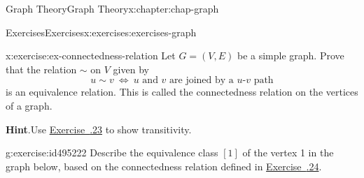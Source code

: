 \documentclass[oneside,10pt,]{book}
\newcommand{\blocktitlefont}{\relax}
\newcommand{\xreffont}{\relax}
\numberwithin{equation}{section}
\begin{document}
\begin{chapterptx}{Graph Theory}{}{Graph Theory}{}{}{x:chapter:chap-graph}
\begin{exercises-section}{Exercises}{}{Exercises}{}{}{x:exercises:exercises-graph}
\begin{divisionexercise}{24}{}{}{x:exercise:ex-connectedness-relation}
Let \(G = (V,E)\) be a simple graph. Prove that the relation \(\sim\) on \(V\) given by%
\begin{equation*}
u \sim v \ \Leftrightarrow \ \text{$u$ and $v$ are joined by a $u$-$v$ path}
\end{equation*}
is an equivalence relation. This is called the connectedness relation on the vertices of a graph.%
\par\smallskip%
\noindent\textbf{\blocktitlefont Hint}.\hypertarget{g:hint:id495214}{}\quad{}Use \hyperlink{x:exercise:ex-path-transitive}{Exercise~{\xreffont 5.8.23}} to show transitivity.%
\end{divisionexercise}%
\begin{divisionexercise}{25}{}{}{g:exercise:id495222}%
Describe the equivalence class \([1]\) of the vertex 1 in the graph below, based on the connectedness relation defined in \hyperlink{x:exercise:ex-connectedness-relation}{Exercise~{\xreffont 5.8.24}}.%
\begin{sidebyside}{1}{0.38}{0.38}{0}%
\begin{sbspanel}{0.24}%
\end{sbspanel}
\end{sidebyside}
\end{divisionexercise}
\end{exercises-section}
\end{chapterptx}
\end{document}
